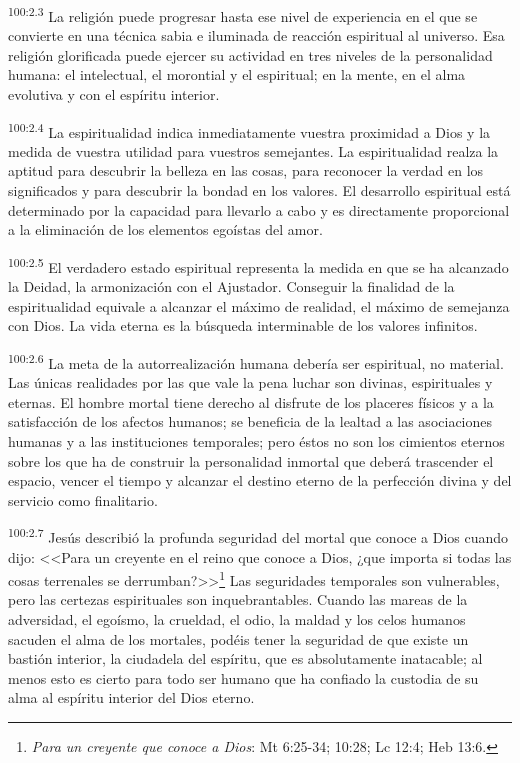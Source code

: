 \par
\textsuperscript{100:2.3} La religión puede progresar hasta ese nivel de experiencia en el que se convierte en una técnica sabia e iluminada de reacción espiritual al universo. Esa religión glorificada puede ejercer su actividad en tres niveles de la personalidad humana: el intelectual, el morontial y el espiritual; en la mente, en el alma evolutiva y con el espíritu interior.

\par
\textsuperscript{100:2.4} La espiritualidad indica inmediatamente vuestra proximidad a Dios y la medida de vuestra utilidad para vuestros semejantes. La espiritualidad realza la aptitud para descubrir la belleza en las cosas, para reconocer la verdad en los significados y para descubrir la bondad en los valores. El desarrollo espiritual está determinado por la capacidad para llevarlo a cabo y es directamente proporcional a la eliminación de los elementos egoístas del amor.

\par
\textsuperscript{100:2.5} El verdadero estado espiritual representa la medida en que se ha alcanzado la Deidad, la armonización con el Ajustador. Conseguir la finalidad de la espiritualidad equivale a alcanzar el máximo de realidad, el máximo de semejanza con Dios. La vida eterna es la búsqueda interminable de los valores infinitos.

\par
\textsuperscript{100:2.6} La meta de la autorrealización humana debería ser espiritual, no material. Las únicas realidades por las que vale la pena luchar son divinas, espirituales y eternas. El hombre mortal tiene derecho al disfrute de los placeres físicos y a la satisfacción de los afectos humanos; se beneficia de la lealtad a las asociaciones humanas y a las instituciones temporales; pero éstos no son los cimientos eternos sobre los que ha de construir la personalidad inmortal que deberá trascender el espacio, vencer el tiempo y alcanzar el destino eterno de la perfección divina y del servicio como finalitario.

\par
\textsuperscript{100:2.7} Jesús describió la profunda seguridad del mortal que conoce a Dios cuando dijo: <<Para un creyente en el reino que conoce a Dios, ¿que importa si todas las cosas terrenales se derrumban?>>\footnote{\textit{Para un creyente que conoce a Dios}: Mt 6:25-34; 10:28; Lc 12:4; Heb 13:6.} Las seguridades temporales son vulnerables, pero las certezas espirituales son inquebrantables. Cuando las mareas de la adversidad, el egoísmo, la crueldad, el odio, la maldad y los celos humanos sacuden el alma de los mortales, podéis tener la seguridad de que existe un bastión interior, la ciudadela del espíritu, que es absolutamente inatacable; al menos esto es cierto para todo ser humano que ha confiado la custodia de su alma al espíritu interior del Dios eterno.

